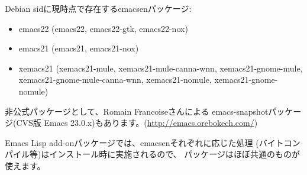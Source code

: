 \documentclass[mingoth,a4paper]{jsarticle}
\begin{document}
Debian sidに現時点で存在するemacsenパッケージ:

\begin{itemize}
 \item emacs22 (emacs22, emacs22-gtk, emacs22-nox)
 \item emacs21 (emacs21, emacs21-nox)
 \item xemacs21 (xemacs21-mule, xemacs21-mule-canna-wnn, xemacs21-gnome-mule,\\
       xemacs21-gnome-mule-canna-wnn, xemacs21-nomule, xemacs21-gnome-nomule)
\end{itemize}

非公式パッケージとして、Romain Francoiseさんによる
emacs-snapshotパッケージ(CVS版 Emacs 23.0.x)もあります。(\url{http://emacs.orebokech.com/})

Emacs Lisp add-onパッケージでは、emacsenそれぞれに応じた処理
(バイトコンパイル等)はインストール時に実施されるので、
パッケージはほぼ共通のものが使えます。


\end{document}

